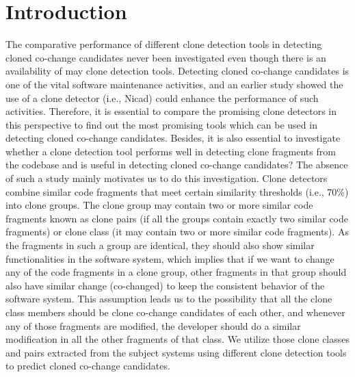 \documentclass[review]{elsarticle}
\begin{document}
\section{Introduction}
\label{introduction-cochage}
The comparative performance of different clone detection tools in detecting cloned co-change candidates never been investigated even though there is an availability of may clone detection tools. Detecting cloned co-change candidates is one of the vital software maintenance activities, and an earlier study \cite{Mondal:Association:Rules} showed the use of a clone detector (i.e., Nicad) could enhance the performance of such activities. Therefore, it is essential to compare the promising clone detectors in this perspective to find out the most promising tools which can be used in detecting cloned co-change candidates. Besides, it is also essential to investigate whether a clone detection tool performs well in detecting clone fragments from the codebase and is useful in detecting cloned co-change candidates?  The absence of such a study mainly motivates us to do this investigation. Clone detectors combine similar code fragments that meet certain similarity thresholds (i.e., 70\%) into clone groups. The clone group may contain two or more similar code fragments known as clone pairs (if all the groups contain exactly two similar code fragments) or clone class (it may contain two or more similar code fragments). As the fragments in such a group are identical, they should also show similar functionalities in the software system, which implies that if we want to change any of the code fragments in a clone group, other fragments in that group should also have similar change (co-changed) to keep the consistent behavior of the software system. This assumption leads us to the possibility that all the clone class members should be clone co-change candidates of each other, and whenever any of those fragments are modified, the developer should do a similar modification in all the other fragments of that class. We utilize those clone classes and pairs extracted from the subject systems using different clone detection tools to predict cloned co-change candidates.
\end{document}
